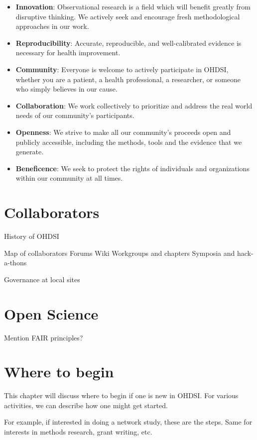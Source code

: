 \documentclass[]{book}
\begin{document}
\begin{itemize}
\item
  \textbf{Innovation}: Observational research is a field which will
  benefit greatly from disruptive thinking. We actively seek and
  encourage fresh methodological approaches in our work.
\item
  \textbf{Reproducibility}: Accurate, reproducible, and well-calibrated
  evidence is necessary for health improvement.
\item
  \textbf{Community}: Everyone is welcome to actively participate in
  OHDSI, whether you are a patient, a health professional, a researcher,
  or someone who simply believes in our cause.
\item
  \textbf{Collaboration}: We work collectively to prioritize and address
  the real world needs of our community's participants.
\item
  \textbf{Openness}: We strive to make all our community's proceeds open
  and publicly accessible, including the methods, tools and the evidence
  that we generate.
\item
  \textbf{Beneficence}: We seek to protect the rights of individuals and
  organizations within our community at all times.
\end{itemize}

\chapter{Collaborators}\label{Collaborators}

History of OHDSI

Map of collaborators Forums Wiki Workgroups and chapters Symposia and
hack-a-thons

Governance at local sites

\chapter{Open Science}\label{OpenScience}

Mention FAIR principles?

\chapter{Where to begin}\label{WhereToBegin}

This chapter will discuss where to begin if one is new in OHDSI. For
various activities, we can describe how one might get started.

For example, if interested in doing a network study, these are the
steps. Same for interests in methods research, grant writing, etc.
\end{document}
